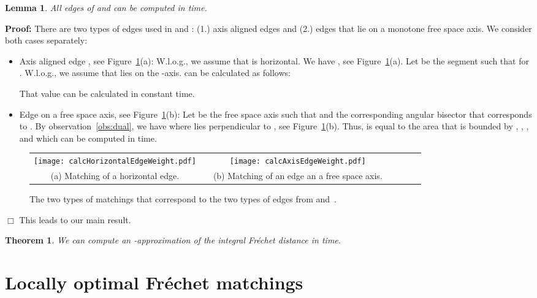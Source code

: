 \documentclass[a4paper,11pt]{article}
\newtheorem{lemma}{Lemma}
\newtheorem{theorem}{Theorem}
\newenvironment{proof}{\textbf{Proof:}}{\hspace*{0mm}\hfill\ensuremath{\Box}}
\begin{document}
\begin{lemma}\label{lem:edgesComputable}
	All edges of  and  can be computed in  time.
\end{lemma}
\begin{proof}
	There are two types of edges used in  and : (1.) axis aligned edges and (2.) edges that lie on a monotone free space axis. We consider both cases separately:
		\begin{itemize}
			\item Axis aligned edge , see Figure~\ref{fig:edgeWeight}(a): W.l.o.g., we assume that  is horizontal. We have , see Figure~\ref{fig:edgeWeight}(a). Let  be the segment such that  for . W.l.o.g., we assume that  lies on the -axis.  can be calculated as follows:
					
				That value can be calculated in constant time.
			\item Edge  on a free space axis, see Figure~\ref{fig:edgeWeight}(b): Let  be the free space axis such that  and  the corresponding angular bisector that corresponds to . By observation~\ref{obs:dual}, we have  where  lies perpendicular to , see Figure~\ref{fig:edgeWeight}(b). Thus,  is equal to the area that is bounded by , , , and  which can be computed in  time.
		\end{itemize}
		
		\begin{figure}[ht]
  \begin{center}
    \begin{tabular}{ccccccc}
      \texttt{[image: calcHorizontalEdgeWeight.pdf]} & &
       \texttt{[image: calcAxisEdgeWeight.pdf]}&&\\ 
{\small (a) Matching of a horizontal edge.} & &
      {\small (b) Matching of an edge an a free space axis.}&&
    \end{tabular}
  \end{center}
  \vspace*{-12pt}
  \caption{The two types of matchings that correspond to the two types of edges from  and~.}
  \label{fig:edgeWeight}
\end{figure}
\end{proof}
This leads to our main result.
\begin{theorem}
	We can compute an -approximation of the integral Fr\'echet distance  in  time.
\end{theorem}

\section{Locally optimal Fr\'{e}chet matchings}
\end{document}

